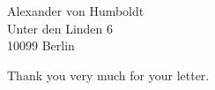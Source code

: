 \documentclass{HUBerlin-letter}
\begin{document}
\begin{letter}{%
Alexander von Humboldt\\
Unter den Linden 6\\
10099 Berlin}
\opening{}
Thank you very much for your letter.
\closing{}



\end{letter}
\end{document}
